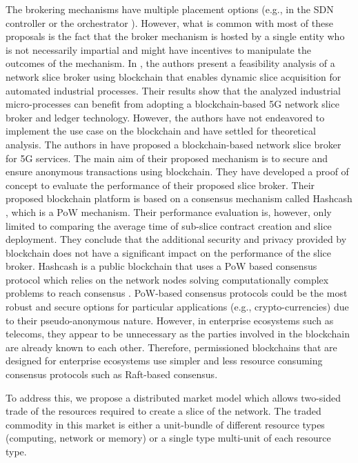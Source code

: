 The brokering mechanisms have multiple placement options (e.g., in the SDN controller \cite{7794896} or the orchestrator \cite{7514161}). However, what is common with most of these proposals is the fact that the broker mechanism is hosted by a single entity who is not necessarily impartial and might have incentives to manipulate the outcomes of the mechanism.
In \cite{8368983}, the authors present a feasibility analysis of a network slice broker using blockchain that enables dynamic slice acquisition for automated industrial processes. Their results show that the analyzed industrial micro-processes can benefit from adopting a blockchain-based \ac{5G} network slice broker and ledger technology. However, the authors have not endeavored to implement the use case on the blockchain and have settled for theoretical analysis. 
The authors in \cite{8707070} have proposed a blockchain-based network slice broker for \ac{5G} services. The main aim of their proposed mechanism is to secure and ensure anonymous transactions using blockchain. They have developed a proof of concept to evaluate the performance of their proposed slice broker. Their proposed blockchain platform is based on a consensus mechanism called Hashcash \cite{hashcash}, which is a \ac{PoW} mechanism. Their performance evaluation is, however, only limited to comparing the average time of sub-slice contract creation and slice deployment. They conclude that the additional security and privacy provided by blockchain does not have a significant impact on the performance of the slice broker. Hashcash is a public blockchain that uses a \ac{PoW} based consensus protocol which relies on the network nodes solving computationally complex problems to reach consensus \cite{8716424}. \ac{PoW}-based consensus protocols could be the most robust and secure options for particular applications (e.g., crypto-currencies) due to their pseudo-anonymous nature. However, in enterprise ecosystems such as telecoms, they appear to be unnecessary as the parties involved in the blockchain are already known to each other. Therefore, permissioned blockchains that are designed for enterprise ecosystems use simpler and less resource consuming consensus protocols such as Raft-based consensus. 

To address this, we propose a distributed market model which allows two-sided trade of the resources required to create a slice of the network. The traded commodity in this market is either a unit-bundle of different resource types (computing, network or memory) or a single type multi-unit of each resource type. 

